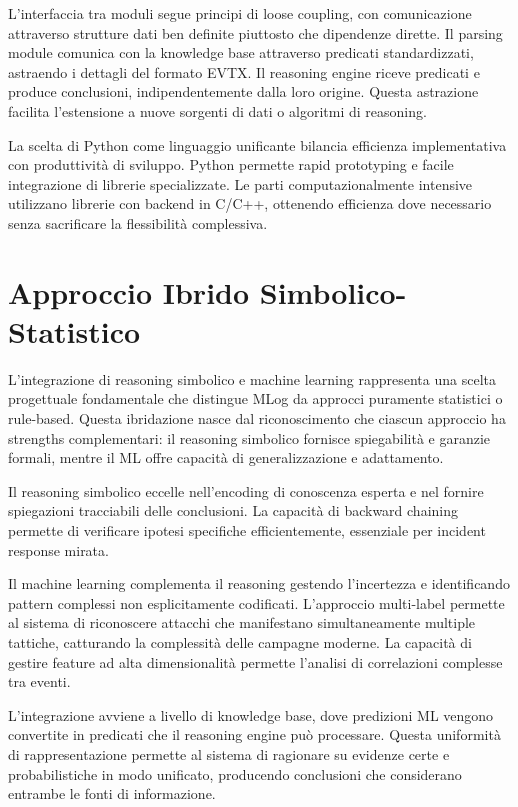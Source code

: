 \documentclass[12pt,a4paper]{report}
\theoremstyle{definition}
\begin{document}
L'interfaccia tra moduli segue principi di loose coupling, con comunicazione attraverso strutture dati ben definite piuttosto che dipendenze dirette. Il parsing module comunica con la knowledge base attraverso predicati standardizzati, astraendo i dettagli del formato EVTX. Il reasoning engine riceve predicati e produce conclusioni, indipendentemente dalla loro origine. Questa astrazione facilita l'estensione a nuove sorgenti di dati o algoritmi di reasoning.

La scelta di Python come linguaggio unificante bilancia efficienza implementativa con produttività di sviluppo. Python permette rapid prototyping e facile integrazione di librerie specializzate. Le parti computazionalmente intensive utilizzano librerie con backend in C/C++, ottenendo efficienza dove necessario senza sacrificare la flessibilità complessiva.

\section{Approccio Ibrido Simbolico-Statistico}

L'integrazione di reasoning simbolico e machine learning rappresenta una scelta progettuale fondamentale che distingue MLog da approcci puramente statistici o rule-based. Questa ibridazione nasce dal riconoscimento che ciascun approccio ha strengths complementari: il reasoning simbolico fornisce spiegabilità e garanzie formali, mentre il ML offre capacità di generalizzazione e adattamento.

Il reasoning simbolico eccelle nell'encoding di conoscenza esperta e nel fornire spiegazioni tracciabili delle conclusioni. La capacità di backward chaining permette di verificare ipotesi specifiche efficientemente, essenziale per incident response mirata.

Il machine learning complementa il reasoning gestendo l'incertezza e identificando pattern complessi non esplicitamente codificati. L'approccio multi-label permette al sistema di riconoscere attacchi che manifestano simultaneamente multiple tattiche, catturando la complessità delle campagne moderne. La capacità di gestire feature ad alta dimensionalità permette l'analisi di correlazioni complesse tra eventi.

L'integrazione avviene a livello di knowledge base, dove predizioni ML vengono convertite in predicati che il reasoning engine può processare. Questa uniformità di rappresentazione permette al sistema di ragionare su evidenze certe e probabilistiche in modo unificato, producendo conclusioni che considerano entrambe le fonti di informazione.
\end{document}
